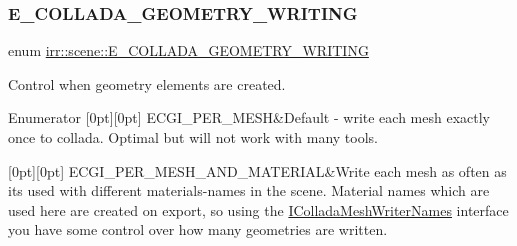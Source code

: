 \subsubsection{\texorpdfstring{E\+\_\+\+C\+O\+L\+L\+A\+D\+A\+\_\+\+G\+E\+O\+M\+E\+T\+R\+Y\+\_\+\+W\+R\+I\+T\+I\+NG}{E\_COLLADA\_GEOMETRY\_WRITING}\hspace{0.1cm}{\footnotesize\ttfamily [1/2]}}
{\footnotesize\ttfamily enum \hyperlink{namespaceirr_1_1scene_a179008e7c02889459edf81394dbd6959}{irr\+::scene\+::\+E\+\_\+\+C\+O\+L\+L\+A\+D\+A\+\_\+\+G\+E\+O\+M\+E\+T\+R\+Y\+\_\+\+W\+R\+I\+T\+I\+NG}}



Control when geometry elements are created. 

\begin{DoxyEnumFields}{Enumerator}
[0pt][0pt]{}\mbox{\label{namespaceirr_1_1scene_a179008e7c02889459edf81394dbd6959a3e88c7e85ad953d279e36e9e68658ef2}} 
E\+C\+G\+I\+\_\+\+P\+E\+R\+\_\+\+M\+E\+SH&Default -\/ write each mesh exactly once to collada. Optimal but will not work with many tools. \\
\hline

[0pt][0pt]{}\mbox{\label{namespaceirr_1_1scene_a179008e7c02889459edf81394dbd6959ae673e963bed1f4bea0acbe4c02fe23de}} 
E\+C\+G\+I\+\_\+\+P\+E\+R\+\_\+\+M\+E\+S\+H\+\_\+\+A\+N\+D\+\_\+\+M\+A\+T\+E\+R\+I\+AL&Write each mesh as often as it\textquotesingle{}s used with different materials-\/names in the scene. Material names which are used here are created on export, so using the \hyperlink{classirr_1_1scene_1_1IColladaMeshWriterNames}{I\+Collada\+Mesh\+Writer\+Names} interface you have some control over how many geometries are written. \\
\hline


\end{DoxyEnumFields}

